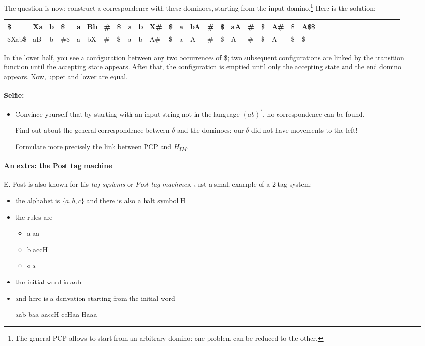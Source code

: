 The question is now: construct a correspondence with these dominoes,
starting from the input domino.\footnote{The general PCP allows to
  start from an arbitrary domino: one problem can be reduced to the
  other.} Here is the solution:


{\footnotesize
\begin{tabular}{|l|l|l|l|l|l|l|l|l|l|l|l|l|l|l|l|l|l|l|l|l|l|l|l|l|l|l|l|l|l|l|l|l|l|}
\hline
\$      & Xa & b & \$   & a & Bb & \# & \$ & a & b & X\# & \$ &  a & bA & \# & \$ & aA & \# & \$ & A\# & \$ & A\$\$\\ \hline
\$Xab\$ & aB & b & \#\$ & a & bX & \# & \$ & a & b & A\# & \$ &  a &  A & \# & \$ & A  & \# & \$ & A   & \$ & \$  \\
\hline
\end{tabular}
}


In the lower half, you see a configuration between any two occurrences of \$;
two subsequent configurations are linked by the
transition function until the accepting state appears. After that,
the configuration is emptied until only the accepting state and the
end domino appears. Now, upper and lower are equal.


\paragraph{Selfie:}
\begin{itemize}
\item[]
Convince yourself that by starting with an input string not in the
language $(ab)^*$, no correspondence can be found.

Find out about the general correspondence between $\delta$ and the
dominoes: our $\delta$ did not have movements to the left!

Formulate more precisely the link between PCP and $H_{TM}$.
\end{itemize}




\paragraph{An extra: the Post tag machine}

E. Post is also known for his {\em tag systems} or {\em Post tag
  machines}. Just a small example of a 2-tag system:

\begin{itemize}
\item the alphabet is $\{a,b,c\}$ and there is also a halt symbol H
\item the rules are
\begin{itemize}
\item a \rpijl aa
\item b \rpijl accH
\item c \rpijl a
\end{itemize}

\item the initial word is aab
\item and here is a derivation starting from the initial word

aab \rpijl baa \rpijl aaccH \rpijl ccHaa \rpijl Haaa
\end{itemize}

